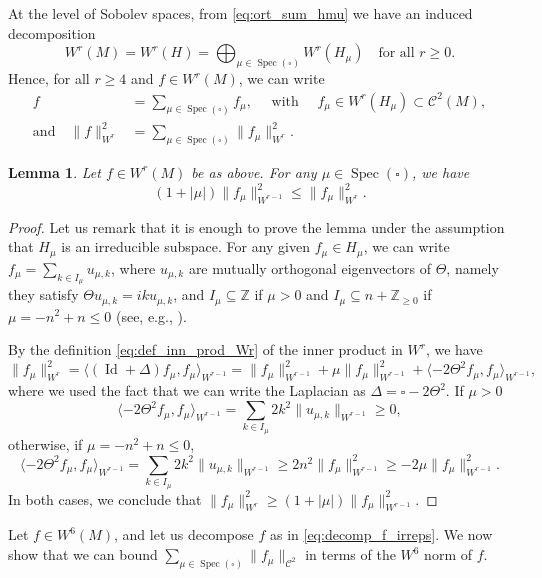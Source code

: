 \documentclass[11pt]{article}
\newcommand \Z{\mathbb{Z}}
\DeclareMathOperator{\Spec}{Spec}
\DeclareMathOperator{\Id}{Id}
\newtheorem {lemma}[theorem]{Lemma}
\theoremstyle{definition}
\begin{document}
At the level of Sobolev spaces, from \eqref{eq:ort_sum_hmu} we have an induced decomposition
\[
W^r(M) = W^r(H) = \bigoplus_{\mu \in \Spec(\square)} W^r(H_{\mu}) \quad \text{for all $r \geq 0$}.
\]
Hence, for all $r \geq 4$ and $f \in W^r(M)$, we can write
\begin{equation}\label{eq:decomp_f_irreps}
\begin{split}
f &= \sum_{\mu \in \Spec(\square)} f_\mu, \quad \text{ with } \quad f_\mu \in W^r(H_{\mu}) \subset \mathscr{C}^2(M), \\
\text{and} \quad \|f\|^2_{W^r} &= \sum_{\mu \in \Spec(\square)} \|f_\mu\|^2_{W^r}.
\end{split}
\end{equation}

\begin{lemma}\label{lemma:w4_to_w6}
Let $f \in W^r(M)$ be as above. For any $\mu \in \Spec(\square)$, we have
\[
(1+|\mu|) \|f_\mu\|^2_{W^{r-1}} \leq \|f_\mu\|^2_{W^r}.
\]
\end{lemma}
\begin{proof}
Let us remark that it is enough to prove the lemma under the assumption that $H_\mu$ is an irreducible subspace.
For any given $f_\mu \in H_\mu$, we can write $f_\mu = \sum_{k \in I_\mu} u_{\mu, k}$, where $u_{\mu, k}$ are mutually orthogonal eigenvectors of $\Theta$, namely they satisfy $\Theta u_{\mu, k} = iku_{\mu, k}$, and $I_\mu \subseteq \Z$ if $\mu >0$ and $I_\mu \subseteq n+ \Z_{\geq 0}$ if $\mu = -n^2+n \leq 0$ (see, e.g., \cite[\S2]{FlaFo}).

By the definition \eqref{eq:def_inn_prod_Wr} of the inner product in $W^r$, we have
\[
\|f_\mu\|^2_{W^r} = \langle (\Id+\Delta) f_\mu, f_\mu \rangle_{W^{r-1}} = \|f_\mu\|^2_{W^{r-1}} + \mu \|f_\mu\|^2_{W^{r-1}} + \langle -2\Theta^2 f_\mu, f_\mu \rangle_{W^{r-1}},
\]
where we used the fact that we can write the Laplacian as $\Delta = \square - 2 \Theta^2$.
If $\mu >0$
\[
\langle -2\Theta^2 f_\mu, f_\mu \rangle_{W^{r-1}} = \sum_{k \in I_\mu} 2k^2 \|u_{\mu, k}\|_{W^{r-1}} \geq 0,
\]
otherwise, if $\mu = -n^2+n \leq 0$,
\[
\langle -2\Theta^2 f_\mu, f_\mu \rangle_{W^{r-1}} = \sum_{k \in I_\mu} 2k^2 \|u_{\mu, k}\|_{W^{r-1}} \geq 2n^2 \|f_\mu\|^2_{W^{r-1}}\geq -2\mu \|f_\mu\|^2_{W^{r-1}}.
\]
In both cases, we conclude that $\|f_\mu\|^2_{W^r} \geq (1+|\mu|)\|f_\mu\|^2_{W^{r-1}}$.
\end{proof}

Let $f \in W^6(M)$, and let us decompose $f$ as in \eqref{eq:decomp_f_irreps}. We now show that we can bound $\sum_{\mu \in \Spec(\square)} \|f_\mu\|_{\mathscr{C}^2}$ in terms of the $W^6$ norm of $f$.
\end{document}
